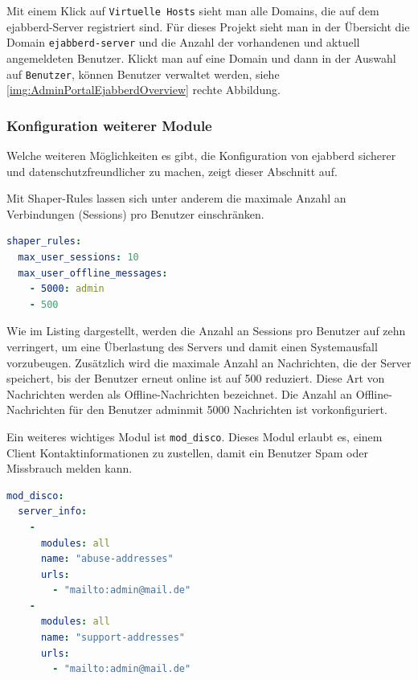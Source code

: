 \documentclass[a4paper,titlepage,halfparskip,12pt]{scrreprt}
\begin{document}
\begin{onehalfspacing}
Mit einem Klick auf \texttt{Virtuelle Hosts} sieht man alle Domains, die auf dem ejabberd-Server registriert sind. Für dieses Projekt sieht man in der Übersicht die Domain \texttt{ejabberd-server} und die Anzahl der vorhandenen und aktuell angemeldeten Benutzer. Klickt man auf eine Domain und dann in der Auswahl auf \texttt{Benutzer}, können Benutzer verwaltet werden, siehe \autoref{img:AdminPortalEjabberdOverview} rechte Abbildung.

\subsubsection*{Konfiguration weiterer Module}

Welche weiteren Möglichkeiten es gibt, die Konfiguration von ejabberd sicherer und datenschutzfreundlicher zu machen, zeigt dieser Abschnitt auf.

Mit Shaper-Rules lassen sich unter anderem die maximale Anzahl an Verbindungen (Sessions) pro Benutzer einschränken.  

\bigskip

\begin{lstlisting}[language=yaml, caption={Anpassung der Shaper-Rules}]
shaper_rules:
  max_user_sessions: 10
  max_user_offline_messages:
    - 5000: admin
    - 500
\end{lstlisting}

Wie im Listing dargestellt, werden die Anzahl an Sessions pro Benutzer auf zehn verringert, um eine Überlastung des Servers und damit einen Systemausfall vorzubeugen. Zusätzlich wird die maximale Anzahl an Nachrichten, die der Server speichert, bis der Benutzer erneut online ist auf 500 reduziert. Diese Art von Nachrichten werden als Offline-Nachrichten bezeichnet. Die Anzahl an Offline-Nachrichten für den Benutzer \glqq admin\grqq mit 5000 Nachrichten ist vorkonfiguriert.

Ein weiteres wichtiges Modul ist \texttt{mod\_disco}. Dieses Modul erlaubt es, einem Client Kontaktinformationen zu zustellen, damit ein Benutzer Spam oder Missbrauch melden kann.

\bigskip

\begin{lstlisting}[language=yaml, caption={Kontaktinformationen für Spam- oder Missbrauchsmeldungen}]
mod_disco:
  server_info:
    -
      modules: all
      name: "abuse-addresses"
      urls:
        - "mailto:admin@mail.de"
    -
      modules: all
      name: "support-addresses"
      urls:
        - "mailto:admin@mail.de"
\end{lstlisting}


\end{onehalfspacing}
\end{document}
